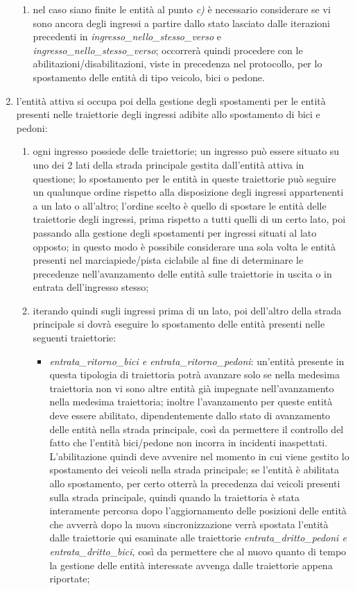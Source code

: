 \begin{enumerate}
\begin{enumerate}
\item nel caso siano finite le entità al punto \textit{c)} è necessario considerare se vi sono ancora degli ingressi a partire dallo stato lasciato dalle iterazioni precedenti in \textit{ingres\-so\_nel\-lo\_stes\-so\_ver\-so} e \textit{ingres\-so\_nel\-lo\_stes\-so\_ver\-so}; occorrerà quindi procedere con le abilitazioni/disabilitazioni, viste in precedenza nel protocollo, per lo spostamento delle entità di tipo veicolo, bici o pedone.
\end{enumerate}
\item l'entità attiva si occupa poi della gestione degli spostamenti per le entità presenti nelle traiettorie degli ingressi adibite allo spostamento di bici e pedoni:
\begin{enumerate}
\item ogni ingresso possiede delle traiettorie; un ingresso può essere situato su uno dei 2 lati della strada principale gestita dall'entità attiva in questione; lo spostamento per le entità in queste traiettorie può seguire un qualunque ordine rispetto alla disposizione degli ingressi appartenenti a un lato o all'altro; l'ordine scelto è quello di spostare le entità delle traiettorie degli ingressi, prima rispetto a tutti quelli di un certo lato, poi passando alla gestione degli spostamenti per ingressi situati al lato opposto; in questo modo è possibile considerare una sola volta le entità presenti nel marciapiede/pista ciclabile al fine di determinare le precedenze nell'avanzamento delle entità sulle traiettorie in uscita o in entrata dell'ingresso stesso;
\item iterando quindi sugli ingressi prima di un lato, poi dell'altro della strada principale si dovrà eseguire lo spostamento delle entità presenti nelle seguenti traiettorie:
\begin{itemize}
\item \textit{en\-tra\-ta\_ri\-tor\-no\_bi\-ci e en\-tra\-ta\_ri\-tor\-no\_pe\-do\-ni}: un'entità presente in questa tipologia di traiettoria potrà avanzare solo se nella medesima traiettoria non vi sono altre entità già impegnate nell'avanzamento nella medesima traiettoria; inoltre l'avanzamento per queste entità deve essere abilitato, dipendentemente dallo stato di avanzamento delle entità nella strada principale, così da permettere il controllo del fatto che l'entità bici/pedone non incorra in incidenti inaspettati. L'abilitazione quindi deve avvenire nel momento in cui viene gestito lo spostamento dei veicoli nella strada principale; se l'entità è abilitata allo spostamento, per certo otterrà la precedenza dai veicoli presenti sulla strada principale, quindi quando la traiettoria è stata interamente percorsa dopo l'aggiornamento delle posizioni delle entità che avverrà dopo la nuova sincronizzazione verrà spostata l'entità dalle traiettorie qui esaminate alle traiettorie \textit{en\-tra\-ta\_drit\-to\_pe\-do\-ni e en\-tra\-ta\_drit\-to\_bi\-ci}, così da permettere che al nuovo quanto di tempo la gestione delle entità interessate avvenga dalle traiettorie appena riportate;

\end{itemize}
\end{enumerate}
\end{enumerate}
